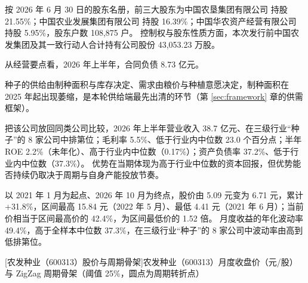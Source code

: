  按 2026 年 6 月 30 日的股东名册，前三大股东为中国农垦集团有限公司 持股 21.55\%；中国农业发展集团有限公司 持股 16.39\%；中国华农资产经营有限公司 持股 5.95\%，股东户数 108,875 户。 控制权与股东性质方面，本次发行前中国农发集团及其一致行动人合计持有公司股份 43,053.23 万股。

 从经营要点看，2026 年上半年，合同负债 8.73 亿元。

 种子的供给由制种面积与库存决定、需求由粮价与种植意愿决定，制种面积在 2025 年起出现萎缩，是本轮供给端最先出清的环节（第 \ref{sec:framework} 章的供需框架）。

 把该公司放回同类公司比较，2026 年上半年营业收入 38.7 亿元、在三级行业“种子”的 8 家公司中排第位；毛利率 5.5\%、低于行业内中位数 23.0 个百分点；半年 ROE 2.2\%（未年化）、高于行业内中位数（0.17\%）；资产负债率 37.2\%、低于行业内中位数（37.3\%）。 优势在当期体现为高于行业中位数的资本回报，但优势能否持续仍取决于周期与自身产能投放节奏。

 以 2021 年 1 月为起点、2026 年 10 月为终点，股价由 5.09 元变为 6.71 元，累计 +31.8\%，区间最高 15.84 元（2022 年 5 月）、最低 4.41 元（2021 年 6 月）；当前价相当于区间最高价的 42.4\%，为区间最低价的 1.52 倍。 月度收益的年化波动率 49.4\%，高于全样本中位数 37.3\%，在三级行业“种子”的 8 家公司中波动率由高到低排第位。

\begin{center}
\begin{minipage}{\textwidth}\centering
{}

[农发种业（600313）股价与周期骨架]{农发种业（600313）月度收盘价（元/股）与 ZigZag 周期骨架（阈值 25\%，圆点为周期转折点）}
\end{minipage}
\end{center}


